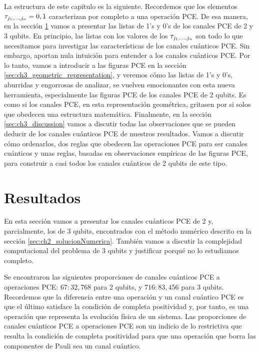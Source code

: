 La estructura de este capítulo es la siguiente.
Recordemos que los elementos $\tau_{j_1,\ldots ,j_n}=0,1$ caracterizan por completo a una 
operación PCE. De esa manera, en la sección \ref{sec:ch3_resultados} vamos a presentar
las listas de 1's y 0's de los canales PCE de 2 y 3 qubits. En principio, las 
listas con los valores de los $\tau_{j_1,\ldots ,j_n}$ son todo lo que necesitamos para investigar las características de 
los canales cuánticos PCE. Sin embargo, aportan nula intuición para entender
a los canales cuánticos PCE. Por lo tanto,
vamos a introducir a las figuras PCE en la sección 
\ref{sec:ch3_geometric_representation}, y veremos cómo las listas de 1's y 0's,
aburridas y engorrosas de analizar, se vuelven emocionantes con esta 
nueva herramienta, especialmente las figuras PCE de los canales 
PCE de 2 qubits. Es como si los canales PCE, en esta representación
geométrica, gritasen por si solos que obedecen una estructura matemática.
Finalmente, en la sección \ref{sec:ch3_discussion} vamos a discutir 
todas las observaciones que se pueden deducir de los canales cuánticos PCE
de nuestros resultados. Vamos a discutir cómo ordenarlos, dos reglas 
que obedecen las operaciones PCE para ser canales cuánticos y unas 
reglas, basadas en observaciones empíricas de las figuras PCE, para 
construir a casi todos los canales cuánticos de 2 qubits de este tipo. 

\section{Resultados}\label{sec:ch3_resultados} %
En esta sección vamos a presentar los canales cuánticos PCE de 2 y,
parcialmente, los de 3 qubits, 
encontrados con el método numérico descrito en la sección 
\ref{sec:ch2_solucionNumerica}. También vamos a discutir la complejidad 
computacional del problema de 3 qubits y justificar porqué no lo estudiamos completo.

Se encontraron las siguientes proporciones de canales cuánticos PCE a 
operaciones PCE: $67:32,768$ para 2 qubits, y $716:83,456$ para 
3 qubits. Recordemos que la diferencia entre una operación y un canal cuántico PCE
es que el último satisface la condición de completa positividad y, por tanto, 
es una operación que representa la evolución física de un sistema. 
Las proporciones de canales cuánticos PCE a operaciones PCE son un indicio 
de lo restrictiva que resulta la condición de completa positividad para que 
una operación que borra las componentes de Pauli sea un canal cuántico.

